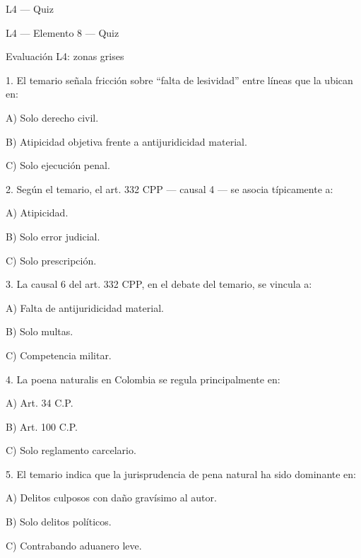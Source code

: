 \documentclass[11pt,a4paper]{article}
\begin{document}
L4 — Quiz\par





    L4 — Elemento 8 — Quiz\par
    Evaluación L4: zonas grises\par


      1. El temario señala fricción sobre “falta de lesividad” entre líneas que la ubican en:\par

         A) Solo derecho civil.\par
         B) Atipicidad objetiva frente a antijuridicidad material.\par
         C) Solo ejecución penal.\par


      2. Según el temario, el art. 332 CPP — causal 4 — se asocia típicamente a:\par

         A) Atipicidad.\par
         B) Solo error judicial.\par
         C) Solo prescripción.\par


      3. La causal 6 del art. 332 CPP, en el debate del temario, se vincula a:\par

         A) Falta de antijuridicidad material.\par
         B) Solo multas.\par
         C) Competencia militar.\par


      4. La poena naturalis en Colombia se regula principalmente en:\par

         A) Art. 34 C.P.\par
         B) Art. 100 C.P.\par
         C) Solo reglamento carcelario.\par


      5. El temario indica que la jurisprudencia de pena natural ha sido dominante en:\par

         A) Delitos culposos con daño gravísimo al autor.\par
         B) Solo delitos políticos.\par
         C) Contrabando aduanero leve.\par
\end{document}
